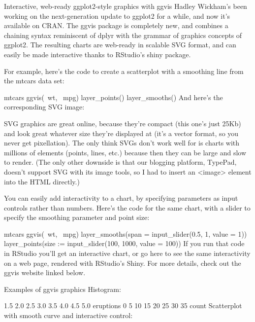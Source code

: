 
Interactive, web-ready ggplot2-style graphics with ggvis
Hadley Wickham's been working on the next-generation update to ggplot2 for a while, and now it's available on CRAN. The ggvis package is completely new, and combines a chaining syntax reminiscent of dplyr with the grammar of graphics concepts of ggplot2. The resulting charts are web-ready in scalable SVG format, and can easily be made interactive thanks to RStudio's shiny package.

For example, here's the code to create a scatterplot with a smoothing line from the mtcars data set:

mtcars %
  ggvis(~wt, ~mpg) %
  layer_points() %
  layer_smooths()
And here's the corresponding SVG image:



SVG graphics are great online, because they're compact (this one's just 25Kb) and look great whatever size they're displayed at (it's a vector format, so you never get pixellation). The only think SVGs don't work well for is charts with millions of elements (points, lines, etc.) because then they can be large and slow to render. (The only other downside is that our blogging platform, TypePad, doesn't support SVG with its image tools, so I had to insert an <image> element into the HTML directly.)

You can easily add interactivity to a chart, by specifying parameters as input controls rather than numbers. Here's the code for the same chart, with a slider to specify the smoothing parameter and point size:

mtcars %
  ggvis(~wt, ~mpg) %
  layer_smooths(span = input_slider(0.5, 1, value = 1)) %
  layer_points(size := input_slider(100, 1000, value = 100))
If you run that code in RStudio you'll get an interactive chart, or go here to see the same interactivity on a web page, rendered with RStudio's Shiny. For more details, check out the ggvis website linked below.


Examples of ggvis graphics
Histogram:

1.5
2.0
2.5
3.0
3.5
4.0
4.5
5.0
eruptions
0
5
10
15
20
25
30
35
count
Scatterplot with smooth curve and interactive control:

